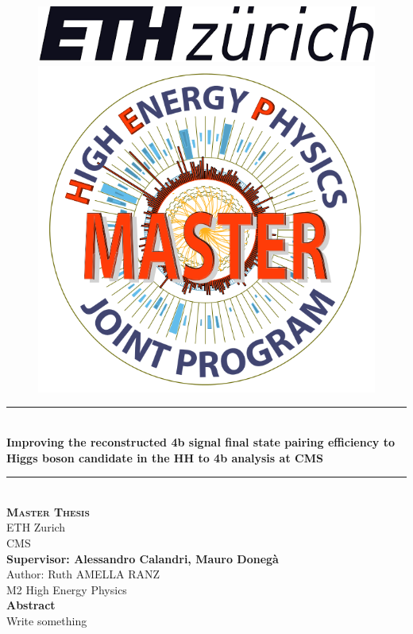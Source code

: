 \documentclass[11pt]{article}
\begin{document}
\begin{titlepage}
\newcommand{\HRule}{\rule{\linewidth}{0.5mm}}
\begin{figure}[H]
\noindent
\begin{minipage}{.5\textwidth}
\begin{flushleft}
    \includegraphics[scale=0.15]{Logos/Unknown.png}
\end{flushleft}
\end{minipage}
\begin{minipage}{.5\textwidth}
\begin{flushright}
\includegraphics[scale=0.2]{Logos/logo_hep_centre_texte_coupe.png}
\end{flushright}
\end{minipage}

\end{figure}
\center
\HRule \\[0.4cm]
{ \huge \bfseries  Improving the reconstructed 4b signal final state pairing efficiency to Higgs boson candidate in the HH to 4b analysis at CMS
 \\[0.15cm] }
 \HRule \\[0.5cm]
 \center 
\textsc{\LARGE\textbf{Master Thesis}}\\[1cm]
{\Large ETH Zurich}\\[0.5cm]
{\Large CMS}\\[1cm]

{\large\textbf{Supervisor: Alessandro Calandri, Mauro Donegà}}\\[1cm]
Author: Ruth AMELLA RANZ\\
M2 High Energy Physics
\\[1cm]
\textbf{Abstract}\\[1cm]
\justifying
Write something


\end{titlepage}
\end{document}
